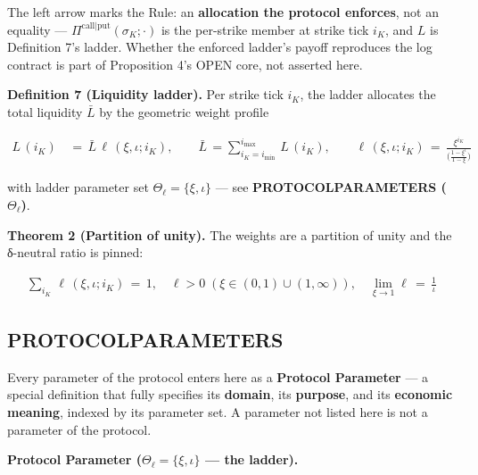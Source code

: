 \documentclass[11pt]{article}
\renewcommand{\_}{\textunderscore\allowbreak}
\begin{document}
The left arrow marks the Rule: an \textbf{allocation the protocol enforces}, not an equality --- \(\Pi^{\text{call|put}}(\sigma_K;\cdot)\) is the per-strike member at strike tick \(i_K\), and \(L\) is Definition 7's ladder. Whether the enforced ladder's payoff reproduces the log contract is part of Proposition 4's OPEN core, not asserted here.

\textbf{Definition 7 (Liquidity ladder).} Per strike tick \(i_K\), the ladder allocates the total liquidity \(\bar L\) by the geometric weight profile

\[
    \begin{aligned}
        L \, (i_K) \, &= \, \bar L \, \ell \, (\xi, \iota; i_K), \qquad \bar L \, = \sum_{i_K = i_{\text{min}}}^{i_{\text{max}}} \, L \, (i_K), \qquad \ell \, (\xi, \iota; i_K) \, = \, \frac{\xi^{i_K}}{\Big ( \frac{1 - \xi^{\iota}}{1 - \xi}\Big)}
    \end{aligned}
\]

with ladder parameter set \(\Theta_{\ell} = \{\xi, \iota\}\) --- see \textbf{PROTOCOL\_PARAMETERS (\(\Theta_{\ell}\))}.

\textbf{Theorem 2 (Partition of unity).} The weights are a partition of unity and the δ-neutral ratio is pinned:

\[
    \begin{aligned}
        \sum_{i_K} \, \ell \, (\xi, \iota; i_K) \, = \, 1, \quad \ell > 0 \; (\xi \in (0,1) \cup (1,\infty)), \quad \lim_{\xi \to 1} \ell \, = \, \frac{1}{\iota}
    \end{aligned}
\]

\subsection*{PROTOCOL\_PARAMETERS}\label{protocol_parameters}

Every parameter of the protocol enters here as a \textbf{Protocol Parameter} --- a special definition that fully specifies its \textbf{domain}, its \textbf{purpose}, and its \textbf{economic meaning}, indexed by its parameter set. A parameter not listed here is not a parameter of the protocol.

\textbf{Protocol Parameter (\(\Theta_{\ell} = \{\xi, \iota\}\) --- the ladder).}
\end{document}
